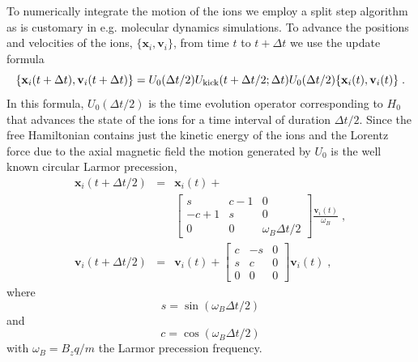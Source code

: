 \documentclass[aps, pra, preprint]{revtex4-1}
\newcommand{\hzero}{H_0}
\begin{document}
To numerically integrate the motion of the ions we employ a split
step algorithm as is customary in e.g. molecular dynamics
simulations. To advance the positions and velocities of the ions,
$\{\mathbf{x}_i, \mathbf{v}_i\}$,
from time $t$ to $t + \Delta t$ we use the update formula
\begin{equation}
  \{\mathbf{x}_i(t+\Delta t), \mathbf{v}_i(t+\Delta t)\} =
  U_{0}(\Delta t /2)
  U_{\rm kick}(t + \Delta t / 2; \Delta t)
  U_{0}(\Delta t /2)
  \{\mathbf{x}_i(t), \mathbf{v}_i(t)\}\;.
\end{equation}
In this formula, $U_{0}(\Delta t/2)$ is the time evolution
operator corresponding to $\hzero$ that advances the state of
the ions for a time interval of duration $\Delta t / 2$. Since
the free Hamiltonian contains just the kinetic energy of the ions
and the Lorentz force due to the axial magnetic field the motion
generated by $U_{0}$ is the well known circular Larmor
precession,
\begin{eqnarray}
  \mathbf{x}_i(t + \Delta t / 2) &=&
                                   \mathbf{x}_i(t)+\\
  &&
      \left[\begin{array}{ccc}
        s & c - 1 & 0\\
        -c + 1 & s & 0\\
        0 & 0 & \omega_B\Delta t / 2
      \end{array}\right]\frac{\mathbf{v}_i(t)}{\omega_B}\;,\nonumber\\
  \mathbf{v}_i(t+\Delta t/2) &=&\mathbf{v}_i(t) + \left[\begin{array}{ccc}
        c & -s & 0\\
        s & c & 0\\
        0 & 0 & 0
      \end{array}\right]\mathbf{v}_i(t)\;,
\end{eqnarray}
where
\begin{equation}
  s = \sin(\omega_B \Delta t / 2)
\end{equation}
and
\begin{equation}
  c = \cos(\omega_B \Delta t / 2)
\end{equation}
with $\omega_B=B_zq/m$ the Larmor precession frequency.
\end{document}
